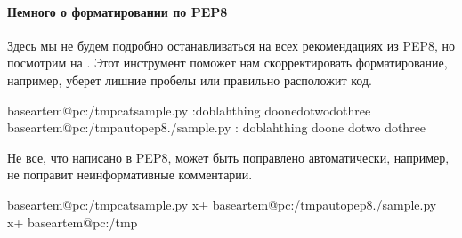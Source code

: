 \documentclass[letterpaper,10pt,russian]{sphinxmanual}
\begin{document}
\paragraph{Немного о форматировании по PEP8}
\label{\detokenize{educational_materials/packaging/content:pep8}}
\sphinxAtStartPar
Здесь мы не будем подробно останавливаться на всех рекомендациях из PEP8, но посмотрим на . Этот инструмент поможет нам скорректировать форматирование, например, уберет лишние пробелы или правильно расположит код.

\begin{sphinxVerbatim}[commandchars=\\\{\}]
baseartem@pc:\PYGZti{}/tmp\PYGZdl{}catsample.py
:do\PYGZus{}blah\PYGZus{}thing
do\PYGZus{}onedo\PYGZus{}twodo\PYGZus{}three
baseartem@pc:\PYGZti{}/tmp\PYGZdl{}autopep8./sample.py
:
do\PYGZus{}blah\PYGZus{}thing
do\PYGZus{}one
do\PYGZus{}two
do\PYGZus{}three
\end{sphinxVerbatim}

\sphinxAtStartPar
Не все, что написано в PEP8, может быть поправлено автоматически, например,  не поправит неинформативные комментарии.

\begin{sphinxVerbatim}[commandchars=\\\{\}]
                     

                     
\end{sphinxVerbatim}

\begin{sphinxVerbatim}[commandchars=\\\{\}]
baseartem@pc:\PYGZti{}/tmp\PYGZdl{}catsample.py
x+
baseartem@pc:\PYGZti{}/tmp\PYGZdl{}autopep8./sample.py
x+
baseartem@pc:\PYGZti{}/tmp\PYGZdl{}
\end{sphinxVerbatim}
\end{document}
